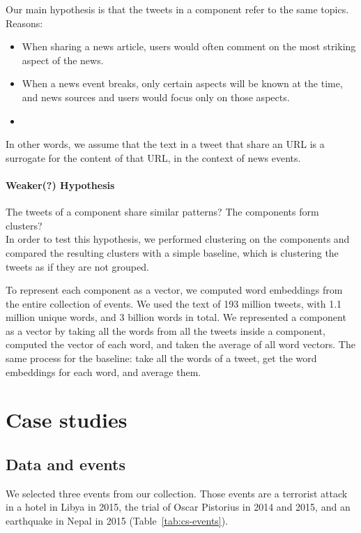 \documentclass{article}
\begin{document}
Our main hypothesis is that the tweets in a component refer to the
same topics. Reasons:

\begin{itemize}
\item When sharing a news article, users would often comment
  on the most striking aspect of the news.
\item When a news event breaks, only certain aspects will be known at
  the time, and news sources and users would focus only on those
  aspects.
\item 
\end{itemize}

In other words, we assume that the text in a tweet that share an URL
is a surrogate for the content of that URL, in the context of news
events.

\paragraph{Weaker(?) Hypothesis} The tweets of a component share similar
patterns? The components form clusters? \\

In order to test this hypothesis, we performed clustering on the
components and compared the resulting clusters with a simple baseline,
which is clustering the tweets as if they are not grouped.

To represent each component as a vector, we computed word embeddings
from the entire collection of events. We used the text of 193 million
tweets, with 1.1 million unique words, and 3 billion words in
total. We represented a component as a vector by taking all the words
from all the tweets inside a component, computed the vector of each
word, and taken the average of all word vectors. The same process for
the baseline: take all the words of a tweet, get the word embeddings
for each word, and average them.

\section{Case studies}

\subsection{Data and events}

We selected three events from our collection. Those events are a
terrorist attack in a hotel in Libya in 2015, the trial of Oscar
Pistorius in 2014 and 2015, and an earthquake in Nepal in 2015
(Table~\ref{tab:cs-events}).
\end{document}
